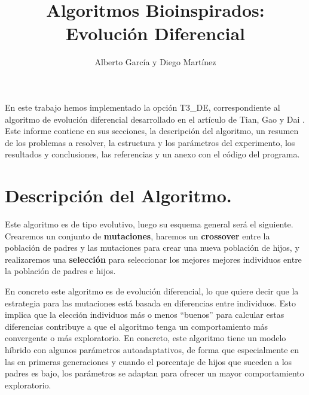 \documentclass{article}
\title{Algoritmos Bioinspirados: Evolución Diferencial}
\author{Alberto García y Diego Martínez}
\begin{document}
\maketitle
En este trabajo hemos implementado la opción T3\_DE, correspondiente al algoritmo de evolución diferencial desarrollado en el artículo de Tian, Gao y Dai \cite{mainPaper}. Este informe contiene en sus secciones, la descripción del algoritmo, un resumen de los problemas a resolver, la estructura y los parámetros del experimento, los resultados y conclusiones, las referencias y un anexo con el código del programa.

\section{Descripción del Algoritmo.}
Este algoritmo es de tipo evolutivo, luego su esquema general será el siguiente. Crearemos un conjunto de \textbf{mutaciones}, haremos un \textbf{crossover} entre la población de padres y las mutaciones para crear una nueva población de hijos, y realizaremos una \textbf{selección} para seleccionar los mejores mejores individuos entre la población de padres e hijos.

En concreto este algoritmo es de evolución diferencial, lo que quiere decir que la estrategia para las mutaciones está basada en diferencias entre individuos. Esto implica que la elección individuos más o menos ``buenos'' para calcular estas diferencias contribuye a que el algoritmo tenga un comportamiento más convergente o más exploratorio. En concreto, este algoritmo tiene un modelo híbrido con algunos parámetros autoadaptativos, de forma que especialmente en las en primeras generaciones y cuando el porcentaje de hijos que suceden a los padres es bajo, los parámetros se adaptan para ofrecer un mayor comportamiento exploratorio.
\end{document}
